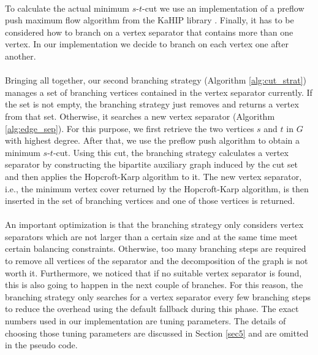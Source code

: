 \documentclass[12pt,a4paper,twoside]{scrartcl}
\numberwithin{equation}{section}
\begin{document}
\paragraph{}
To calculate the actual minimum $s$-$t$-cut we use an implementation of a preflow push maximum flow algorithm from the KaHIP library \cite{KAHIP}. Finally, it has to be considered how to branch on a vertex separator that contains more than one vertex. In our implementation we decide to branch on each vertex one after another.
\paragraph{}
Bringing all together, our second branching strategy (Algorithm \ref{alg:cut_strat}) manages a set of branching vertices contained in the vertex separator currently. If the set is not empty, the branching strategy just removes and returns a vertex from that set. Otherwise, it searches a new vertex separator (Algorithm \ref{alg:edge_sep}). For this purpose, we first retrieve the two vertices $s$ and $t$ in $G$ with highest degree. After that, we use the preflow push algorithm to obtain a minimum $s$-$t$-cut. Using this cut, the branching strategy calculates a vertex separator by constructing the bipartite auxiliary graph induced by the cut set and then applies the Hopcroft-Karp algorithm to it. The new vertex separator, i.e., the minimum vertex cover returned by the Hopcroft-Karp algorithm, is then inserted in the set of branching vertices and one of those vertices is returned.

\paragraph{}
An important optimization is that the branching strategy only considers vertex separators which are not larger than a certain size and at the same time meet certain balancing constraints. Otherwise, too many branching steps are required to remove all vertices of the separator and the decomposition of the graph is not worth it. Furthermore, we noticed that if no suitable vertex separator is found, this is also going to happen in the next couple of branches. For this reason, the branching strategy only searches for a vertex separator every few branching steps to reduce the overhead using the default fallback during this phase. The exact numbers used in our implementation are tuning parameters. The details of choosing those tuning parameters are discussed in Section \ref{sec5} and are omitted in the pseudo code. 
\end{document}
